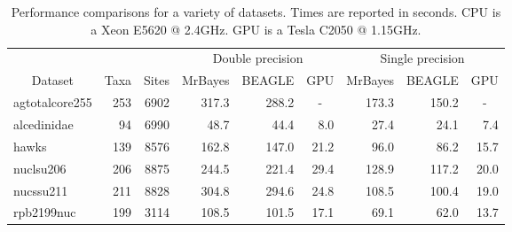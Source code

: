 \documentclass[11pt]{article}
\begin{document}
\begin{sidewaystable}
\caption{Performance comparisons for a variety of datasets.  Times are reported in seconds.  CPU is a Xeon E5620 @ 2.4GHz.  GPU is a Tesla C2050 @ 1.15GHz.}
\centering
\medskip
\begin{tabular}{lrrrrrrrr}
\hline\hline
 & & &
\multicolumn{3}{c}{Double precision} &
\multicolumn{3}{c}{Single precision}  \\
\cmidrule(lr){4-6}
\cmidrule(lr){7-9}
\multicolumn{1}{c}{Dataset} &
\multicolumn{1}{c}{Taxa} &
\multicolumn{1}{c}{Sites} &
\multicolumn{1}{c}{MrBayes} &
\multicolumn{1}{c}{BEAGLE} &
\multicolumn{1}{c}{GPU} &
\multicolumn{1}{c}{MrBayes} &
\multicolumn{1}{c}{BEAGLE} & 
\multicolumn{1}{c}{GPU} \\
\hline
 agtotalcore255 & 253 & 6902 &  317.3 &  288.2 &   \multicolumn{1}{c}{-} &  173.3 &  150.2 &    \multicolumn{1}{c}{-}\\ 
    alcedinidae &  94 & 6990 &   48.7 &   44.4 &    8.0 &   27.4 &   24.1 &    7.4 \\ 
          hawks & 139 & 8576 &  162.8 &  147.0 &   21.2 &   96.0 &   86.2 &   15.7 \\ 
      nuclsu206 & 206 & 8875 &  244.5 &  221.4 &   29.4 &  128.9 &  117.2 &   20.0 \\ 
      nucssu211 & 211 & 8828 &  304.8 &  294.6 &   24.8 &  108.5 &  100.4 &   19.0 \\ 
     rpb2199nuc & 199 & 3114 &  108.5 &  101.5 &   17.1 &   69.1 &   62.0 &   13.7 \\ 
\hline
\end{tabular}
\end{sidewaystable}
\end{document}
